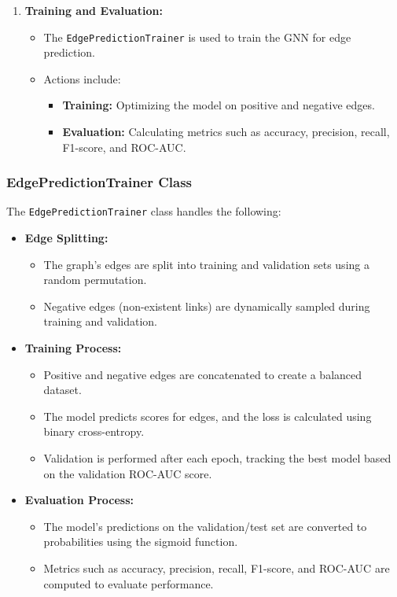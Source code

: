 {\begin{enumerate}
		\item \textbf{Training and Evaluation:} 
		\begin{itemize}
			\item The \texttt{EdgePredictionTrainer} is used to train the GNN for edge prediction.
			\item Actions include:
			\begin{itemize}
				\item \textbf{Training:} Optimizing the model on positive and negative edges.
				\item \textbf{Evaluation:} Calculating metrics such as accuracy, precision, recall, F1-score, and ROC-AUC.
			\end{itemize}
		\end{itemize}
	\end{enumerate}
	
	\subsubsection{EdgePredictionTrainer Class}
	The \texttt{EdgePredictionTrainer} class handles the following:
	
	\begin{itemize}
		\item \textbf{Edge Splitting:} 
		\begin{itemize}
			\item The graph's edges are split into training and validation sets using a random permutation.
			\item Negative edges (non-existent links) are dynamically sampled during training and validation.
		\end{itemize}
		
		\item \textbf{Training Process:} 
		\begin{itemize}
			\item Positive and negative edges are concatenated to create a balanced dataset.
			\item The model predicts scores for edges, and the loss is calculated using binary cross-entropy.
			\item Validation is performed after each epoch, tracking the best model based on the validation ROC-AUC score.
		\end{itemize}
		
		\item \textbf{Evaluation Process:} 
		\begin{itemize}
			\item The model's predictions on the validation/test set are converted to probabilities using the sigmoid function.
			\item Metrics such as accuracy, precision, recall, F1-score, and ROC-AUC are computed to evaluate performance.
		\end{itemize}
	\end{itemize}
	
}
